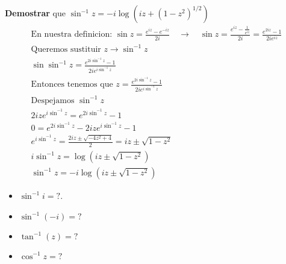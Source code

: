 \documentclass{article}
\newcommand{\caja}[3]{%
  \begin{tcolorbox}[colback=#1!5!white,colframe=#1!25!black,title=#2]
    #3
  \end{tcolorbox}%
}
\begin{document}
\textbf{Demostrar } que $ \sin ^ {-1 }{z } = - i \log{\left(i z + (1 - z ^2)^ {1/2 }\right)} $
\begin{gather*}
  \text{En nuestra definicion: } \sin{z } = \frac{e ^ {i z }- e ^ {-i z }}{2 i } \quad \rightarrow \quad \sin{z } = \frac{e ^ {iz }- \frac{1}{e ^ {iz }}}{2i } = \frac{e ^ {2iz } - 1 }{2i e ^ {iz }}\\
  \text{Queremos sustituir }z \rightarrow \sin ^ {-1 }z \\
  \sin{\sin ^ {-1 } z } = \frac{e ^ {2 i \sin ^ {-1 }z }- 1 }{2i e ^ {i \sin ^ {-1 }z }}\\
  \text{Entonces tenemos que } z = \frac{e ^ {2 i \sin ^ {-1 }z }- 1 }{2 i e ^ {i \sin ^ {-1 }z }}\\
  \text{Despejamos }\sin ^ {-1 }z \\
  2 i z e ^ {i \sin ^ {-1 } z } = e ^ {2i \sin ^ {-1 } z }- 1\\
  0 = e ^ {2i \sin ^ {-1 }z }- 2 i z e ^ {i \sin ^ {-1 } z }-1 \\
  e ^ {i \sin ^ {-1 }z } = \frac{2 i z \pm \sqrt{-4 z ^2 + 4 } }{2} = iz \pm  \sqrt{1 - z ^2} \\
  i \sin ^ {-1 } z = \log{\left(i z \pm \sqrt{1 - z ^2 } \right)}\\
  \sin ^ {-1 }z =  - i \log{\left(i z \pm \sqrt{1 - z ^2} \right)}
\end{gather*}

\caja{blue}{Ejercicios }{
  \begin{itemize}
    \item $ \sin ^ {-1 }i = ?  $. 
    \item $ \sin ^ {-1 } (-i )  = ? $
    \item $\tan ^ {-1 }(z) = ? $
    \item $\cos ^ {-1 }z = ?$
  \end{itemize}
}
\end{document}
